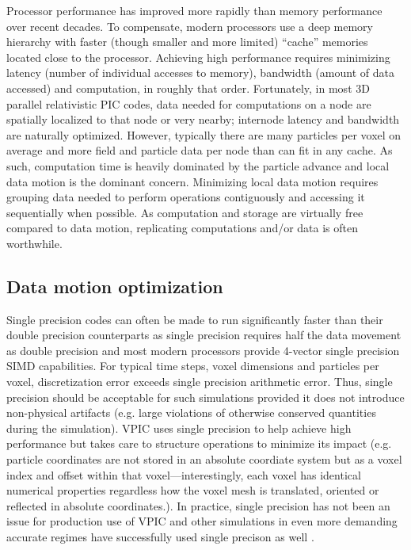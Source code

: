 \documentclass[10pt]{article}
\begin{document}
Processor performance has improved more rapidly than memory
performance over recent decades.  To compensate, modern processors use
a deep memory hierarchy with faster (though smaller and more limited)
``cache'' memories located close to the processor.  Achieving high
performance requires minimizing latency (number of individual accesses
to memory), bandwidth (amount of data accessed) and computation, in
roughly that order.  Fortunately, in most 3D parallel relativistic PIC
codes, data needed for computations on a node are spatially localized
to that node or very nearby; internode latency and bandwidth are
naturally optimized.  However, typically there are many particles per
voxel on average and more field and particle data per node than can
fit in any cache.  As such, computation time is heavily dominated by
the particle advance and local data motion is the dominant concern.
Minimizing local data motion requires grouping data needed to perform
operations contiguously and accessing it sequentially when possible.
As computation and storage are virtually free compared to data motion,
replicating computations and/or data is often worthwhile.

\subsection{Data motion optimization}

Single precision codes can often be made to run significantly faster
than their double precision counterparts as single precision requires
half the data movement as double precision and most modern processors
provide 4-vector single precision SIMD capabilities.  For typical time
steps, voxel dimensions and particles per voxel, discretization error
exceeds single precision arithmetic error.  Thus, single precision
should be acceptable for such simulations provided it does not
introduce non-physical artifacts (e.g. large violations of otherwise
conserved quantities during the simulation).  VPIC uses single
precision to help achieve high performance but takes care to structure
operations to minimize its impact (e.g. particle coordinates are not
stored in an absolute coordiate system but as a voxel index and offset
within that voxel---interestingly, each voxel has identical numerical
properties regardless how the voxel mesh is translated, oriented or
reflected in absolute coordinates.).  In practice, single precision
has not been an issue for production use of VPIC and other simulations
in even more demanding accurate regimes have successfully used single
precison as well
\cite{Bowers_et_al_2006,Lippert_et_al_2007,Langou_et_al_2006}.
\end{document}
